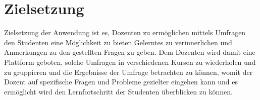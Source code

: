 \section{Zielsetzung}

Zielsetzung der Anwendung ist es, Dozenten zu ermöglichen mittels Umfragen den Studenten eine Möglichkeit zu bieten Gelerntes zu verinnerlichen und Anmerkungen zu den gestellten Fragen zu geben.
Dem Dozenten wird damit eine Plattform geboten, solche Umfragen in verschiedenen Kursen zu wiederholen und zu gruppieren und die Ergebnisse der Umfrage betrachten zu können, womit der Dozent auf spezifische Fragen und Probleme gezielter eingehen kann und es ermöglicht wird den Lernfortschritt der Studenten überblicken zu können.
 